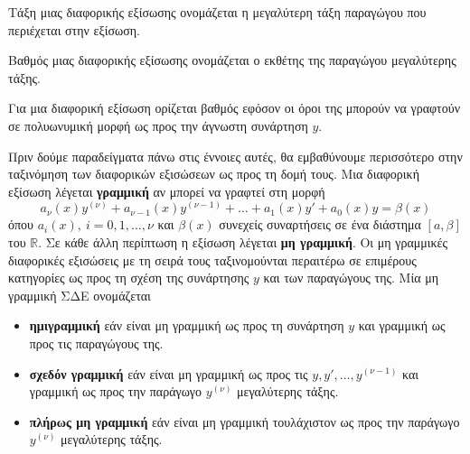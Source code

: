 \documentclass[11pt,a4paper,twoside]{book}
\newcounter{orismos}[chapter]
\renewcommand{\theorismos}{\thechapter.\arabic{orismos}}
\newcommand{\orism}{\refstepcounter{orismos}{\bf\titlefont{\textcolor{maincolor}{\large{Ορισμός}\hspace{2mm}\theorismos}}}\hspace{1mm}}{}
\newenvironment{Orismos}[1]
{\begin{tcolorbox}[title=\orism:\ \  {\bf{\large\titlefont{#1}}},
breakable,
enhanced standard,
titlerule=-.2pt,
toprule=0pt, 
rightrule=0pt, 
bottomrule=0pt,
colback=white,
opacityfill=0,
left=2mm,
top=1mm,
bottom=0mm,
boxrule=0pt,
colframe=white,
borderline west={1.5mm}{0pt}{maincolor},
leftrule=2mm,
sharp corners,
coltitle=black]}
{\end{tcolorbox}}
\newenvironment{Parathrhsh}[1]
{\begin{tcolorbox}[title=\textbf{\faInfoCircle\ \ \ \titlefont{{\large Παρατήρηση}}},
breakable,
enhanced standard,
lifted shadow={1mm}{-2mm}{3mm}{0.3mm}{black!50!white},
colback=yellow!5!white,
boxrule=0.1pt,
colframe=yellow!80!black,
hyphenationfix=true,
fonttitle=\bfseries,
toptitle=1mm,
bottomtitle=1mm,
width=#1]}
{\end{tcolorbox}}
\begin{document}
\begin{Orismos}{Τάξη και βαθμός Δ.Ε.}
\begin{alist}
\item Τάξη μιας διαφορικής εξίσωσης ονομάζεται η μεγαλύτερη τάξη παραγώγου που περιέχεται στην εξίσωση. 
\item Βαθμός μιας διαφορικής εξίσωσης ονομάζεται ο εκθέτης της παραγώγου μεγαλύτερης τάξης.
\end{alist}
\end{Orismos}
\begin{marginfigure}[-3cm]
\begin{Parathrhsh}{5cm}
Για μια διαφορική εξίσωση ορίζεται βαθμός εφόσον οι όροι της μπορούν να γραφτούν σε πολυωνυμική μορφή ως προς την άγνωστη συνάρτηση $y$.
\end{Parathrhsh}
\end{marginfigure}
Πριν δούμε παραδείγματα πάνω στις έννοιες αυτές, θα εμβαθύνουμε περισσότερο στην ταξινόμηση των διαφορικών εξισώσεων ως προς τη δομή τους. Μια διαφορική εξίσωση λέγεται \textbf{γραμμική} αν μπορεί να γραφτεί στη μορφή
\[ a_{\nu}(x)y^{(\nu)}+a_{\nu-1}(x)y^{(\nu-1)}+\ldots+a_1(x)y'+a_0(x)y=\beta(x) \]
όπου $a_i(x),\ i=0,1,\ldots,\nu$ και $\beta(x)$ συνεχείς συναρτήσεις σε ένα διάστημα $[a,\beta]$ του $\mathbb{R}$. Σε κάθε άλλη περίπτωση η εξίσωση λέγεται \textbf{μη γραμμική}. Οι μη γραμμικές διαφορικές εξισώσεις με τη σειρά τους ταξινομούνται περαιτέρω σε επιμέρους κατηγορίες ως προς τη σχέση της συνάρτησης $y$ και των παραγώγους της. Μία μη γραμμική ΣΔΕ ονομάζεται
\begin{itemize}
\item \textbf{ημιγραμμική} εάν είναι μη γραμμική ως προς τη συνάρτηση $y$ και γραμμική ως προς τις παραγώγους της.
\item \textbf{σχεδόν γραμμική} εάν είναι μη γραμμική ως προς τις $y,y',\ldots,y^{(\nu-1)}$ και γραμμική ως προς την παράγωγο $y^{(\nu)}$ μεγαλύτερης τάξης.
\item \textbf{πλήρως μη γραμμική} εάν είναι μη γραμμική τουλάχιστον ως προς την παράγωγο $y^{(\nu)}$ μεγαλύτερης τάξης.
\end{itemize}
\end{document}
